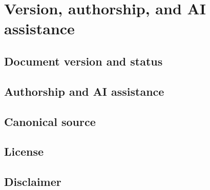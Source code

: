\documentclass[11pt, a4paper, twoside]{report}
\begin{document}
\section{Version, authorship, and AI assistance}
\label{sec:C1-S4}

\subsection{Document version and status}
\label{sec:C1-S4-S1}

\subsection{Authorship and AI assistance}
\label{sec:C1-S4-S2}

\subsection{Canonical source}
\label{sec:C1-S4-S3}

\subsection{License}
\label{sec:C1-S4-S4}

\subsection{Disclaimer}
\label{sec:C1-S4-S5}

\newpage

\end{document}
